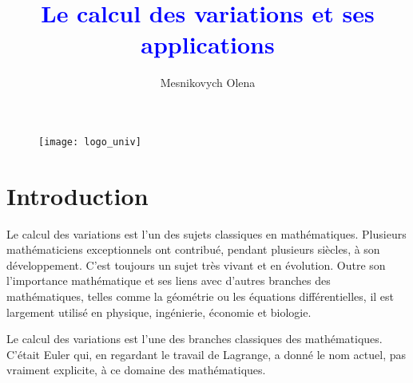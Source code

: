\documentclass[10pt,a4paper]{article}%
\title{\textcolor{blue}{\textbf{Le calcul des variations et ses applications}}}
\author{Mesnikovych Olena}
\theoremstyle{theorem}
\theoremstyle{definition}
\begin{document}
\begin{figure}
	
	\texttt{[image: logo\_univ]}
	
\end{figure}


\maketitle


\newpage
\tableofcontents

\newpage

	\section{Introduction}
	
	
	
	Le calcul des variations est l'un des sujets classiques en mathématiques.
	Plusieurs mathématiciens exceptionnels ont contribué, pendant plusieurs siècles, à son développement. C'est toujours un sujet très vivant et en évolution. Outre son
	l'importance mathématique et ses liens avec d'autres branches des mathématiques, telles comme la géométrie ou les équations différentielles, il est largement utilisé en physique, ingénierie, économie et biologie.
	
	Le calcul des variations est l'une des branches classiques des mathématiques. C'était Euler qui, en regardant le travail de Lagrange, a donné le nom actuel, pas vraiment explicite, à ce domaine des mathématiques.
	
\end{document}
